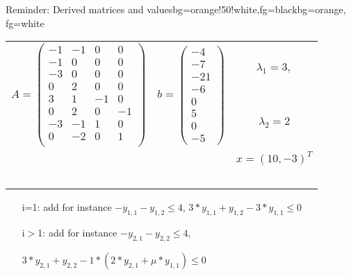 \begin{frame}
	\begin{variableblock}{Reminder: Derived matrices and values}{bg=orange!50!white,fg=black}{bg=orange, fg=white}
		\begin{tabular}{llc}
			\multirow{2}{*}{$A=\begin{pmatrix}
				-1 		& -1 		&  0		& 0		 \\
				-1 		& 0 		&  0		& 0		 \\
				-3 		& 0 		&  0		& 0		 \\
				0 		& 2 		&  0		& 0		 \\
				3 		& 1 		&  -1		& 0		 \\
				0 		& 2 		&  0		& -1	 \\
				-3 		& -1 		&  1		& 0		 \\
				0 		& -2 		&  0		& 1	 	 \\
				\end{pmatrix}$}&\multirow{2}{*}{$ b=\begin{pmatrix}
				-4 \\ -7 \\ -21 \\ -6 \\ 0 \\ 5 \\ 0 \\ -5
				\end{pmatrix} $}& $\lambda_1 = 3,$ \\
			& &  $\lambda_2 = 2$\\
			& & $x=(10, -3)^T$ \\
			& & \\
			& & \\
			& & \\
			& & \\
			& & \\
		\end{tabular}
	\end{variableblock}
	\begin{example}
		\begin{itemize}
			\setlength{\itemindent}{0.25cm}
			\item[i=1:] add for instance $-y_{1,1}-y_{1,2}\le 4$, $3*y_{1,1}+y_{1,2}-3*y_{1,1}\le0$
			\item[i$>$1:] add for instance $-y_{2,1}-y_{2,2}\le 4$, 
			\item[] $3*y_{2,1}+y_{2,2}-1*(2*y_{2,1}+\mu*y_{1,1})\le0$
		\end{itemize}
	\end{example}
\end{frame}




